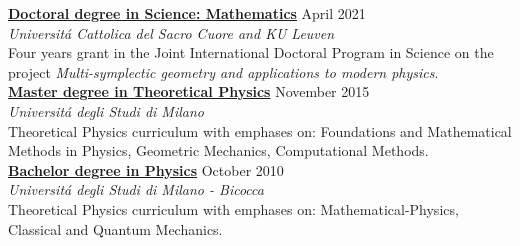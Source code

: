 \documentclass[a4paper]{article}
\newcommand{\voice}[5]{\href{#4}{\textbf{#1}} \hfill #2 \\ \textit{#3} \\ {\small #5} \vspace{0.2cm} \\}
\begin{document}
\begin{minipage}[t]{0.6\columnwidth}
    
    \voice{Doctoral degree in Science: Mathematics}
        {April 2021}
        {Universit\'a Cattolica del Sacro Cuore and KU Leuven}
        {https://web.archive.org/save/http://scuoledidottorato.unicatt.it/phdschools/science-research-projects}       
        {Four years grant in the Joint International Doctoral Program in Science on the project \emph{Multi-symplectic geometry and applications to modern physics}. }
    \voice{Master degree in Theoretical Physics}
        {November 2015}
        {Universit\'a degli Studi di Milano}
        {https://fisica-lm.cdl.unimi.it/it}       
        {Theoretical Physics curriculum with emphases on: Foundations and Mathematical Methods in Physics, Geometric Mechanics, Computational Methods.}
    \voice{Bachelor degree in Physics}
        {October 2010}
        {Universit\'a degli Studi di Milano - Bicocca}
        {https://www.fisica.unimib.it/en}       
        {Theoretical Physics curriculum with emphases on: Mathematical-Physics, Classical and Quantum Mechanics.\vspace{-0.25cm}}

















\end{minipage} 
\hfill
\end{document}
